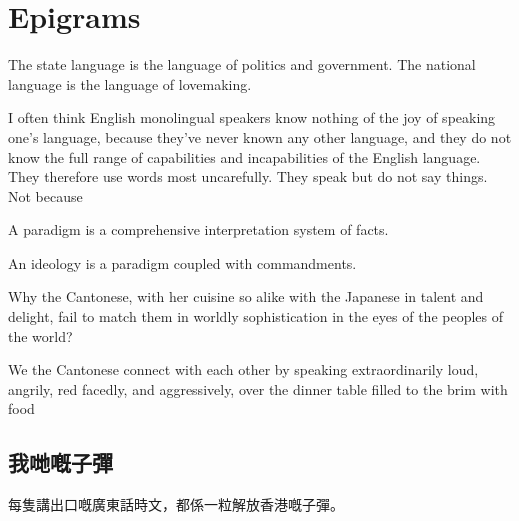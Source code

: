 


\chapter{Epigrams}
The state language is the language of politics and government. The national language is the language of lovemaking.


I often think English monolingual speakers know nothing of the joy of speaking one’s language, because they’ve never known any other language, and they do not know the full range of capabilities and incapabilities of the English language. They therefore use words most uncarefully. They speak but do not say things. Not because



A paradigm is a comprehensive interpretation system of facts.

An ideology is a paradigm coupled with commandments.




Why the Cantonese, with her cuisine so alike with the Japanese in talent and delight, fail to match them in worldly sophistication in the eyes of the peoples of the world?








We the Cantonese connect with each other by speaking extraordinarily loud, angrily, red facedly, and aggressively, over the dinner table filled to the brim with food


\section{我哋嘅子彈}
每隻講出口嘅廣東話時文，都係一粒解放香港嘅子彈。